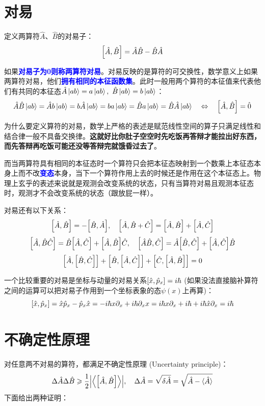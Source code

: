 \newpage
\section{对易}
定义两算符$\hat{A}$、$\hat{B}$的对易子：
\[\comm{\hat{A}}{\hat{B}}=\hat{A}\hat{B}-\hat{B}\hat{A}\]

如果\textcolor{blue}{\textbf{对易子为0则称两算符对易}}。对易反映的是算符的可交换性，数学意义上如果两算符对易，他们\textcolor{blue}{\textbf{拥有相同的本征函数集}}。此时一般用两个算符的本征值来代表他们有共同的本征态$\hat{A}\ket{ab}=a\ket{ab}, \ \hat{B}\ket{ab}=b\ket{ab}$：
\[\hat{A}\hat{B}\ket{ab}=\hat{A}b\ket{ab}=b\hat{A}\ket{ab}=ba\ket{ab}=\hat{B}a\ket{ab}=\hat{B}\hat{A}\ket{ab} \quad \Leftrightarrow \quad \comm{\hat{A}}{\hat{B}}=\hat{0}\]

为什么要定义算符的对易，数学上严格的表述是赋范线性空间的算子只满足线性和结合律一般不具备交换律。\textbf{这就好比你肚子空空时先吃饭再答辩才能拉出好东西，而先答辩再吃饭可能还没等答辩完就饿昏过去了}。

而当两算符具有相同的本征态时一个算符只会把本征态映射到一个数乘上本征态本身上而不改\textcolor{blue}{\textbf{变态}}本身，当下一个算符作用上去的时候还是作用在这个本征态上。物理上玄乎的表述来说就是观测会改变系统的状态，只有当算符对易且观测本征态时，观测才不会改变系统的状态（跟放屁一样）。

对易还有以下关系：
\[\comm{\hat{A}}{\hat{B}}=-\comm{\hat{B}}{\hat{A}}, \quad \comm{\hat{A}}{\hat{B}+\hat{C}}=\comm{\hat{A}}{\hat{B}}+\comm{\hat{A}}{\hat{C}}\]
\[\comm{\hat{A}}{\hat{B}\hat{C}}=\hat{B}\comm{\hat{A}}{\hat{C}}+\comm{\hat{A}}{\hat{B}}\hat{C}, \quad \comm{\hat{A}\hat{B}}{\hat{C}}=\hat{A}\comm{\hat{B}}{\hat{C}}+\comm{\hat{A}}{\hat{C}}\hat{B}\]
\[\comm{\hat{A}}{\comm{\hat{B}}{\hat{C}}}+\comm{\hat{B}}{\comm{\hat{A}}{\hat{C}}}+\comm{\hat{C}}{\comm{\hat{A}}{\hat{B}}}=0\]

一个比较重要的对易是坐标与动量的对易关系$\comm{\hat{x}}{\hat{p}_x}=i\hbar$ (如果没法直接脑补算符之间的运算可以把对易子作用到一个坐标表象的态$\psi(x)$上再算)：
\[\comm{\hat{x}}{\hat{p}_x}=\hat{x}\hat{p}_x-\hat{p}_x\hat{x}=-i\hbar x\partial_x+i\hbar\partial_xx=i\hbar x\partial_x+i\hbar+i\hbar\hat{x}\partial_x=i\hbar\]

\section{不确定性原理}
对任意两不对易的算符，都满足不确定性原理 (Uncertainty principle)：
\[\Delta \hat{A}\Delta \hat{B} \geqslant \frac{1}{2}\qty|\left \langle \comm{\hat{A}}{\hat{B}} \right \rangle|, \quad \Delta\hat{A}=\sqrt{\delta\hat{A}}=\sqrt{\hat{A}-\langle \hat{A} \rangle}\]
下面给出两种证明：

